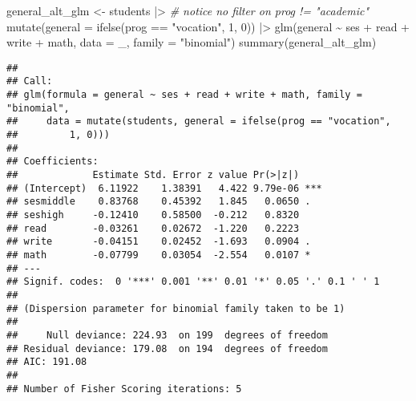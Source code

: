 \documentclass[
  oneside]{book}
\newenvironment{Shaded}{\begin{snugshade}}{\end{snugshade}}
\newcommand{\AttributeTok}[1]{\textcolor[rgb]{0.77,0.63,0.00}{#1}}
\newcommand{\CommentTok}[1]{\textcolor[rgb]{0.56,0.35,0.01}{\textit{#1}}}
\newcommand{\DecValTok}[1]{\textcolor[rgb]{0.00,0.00,0.81}{#1}}
\newcommand{\FunctionTok}[1]{\textcolor[rgb]{0.00,0.00,0.00}{#1}}
\newcommand{\NormalTok}[1]{#1}
\newcommand{\OtherTok}[1]{\textcolor[rgb]{0.56,0.35,0.01}{#1}}
\newcommand{\SpecialCharTok}[1]{\textcolor[rgb]{0.00,0.00,0.00}{#1}}
\newcommand{\StringTok}[1]{\textcolor[rgb]{0.31,0.60,0.02}{#1}}
\begin{document}
\begin{Shaded}
\begin{Highlighting}[]
\NormalTok{general\_alt\_glm }\OtherTok{\textless{}{-}}\NormalTok{ students }\SpecialCharTok{|\textgreater{}} \CommentTok{\# notice no filter on prog != "academic"}
  \FunctionTok{mutate}\NormalTok{(}\AttributeTok{general =} \FunctionTok{ifelse}\NormalTok{(prog }\SpecialCharTok{==} \StringTok{"vocation"}\NormalTok{, }\DecValTok{1}\NormalTok{, }\DecValTok{0}\NormalTok{)) }\SpecialCharTok{|\textgreater{}}
  \FunctionTok{glm}\NormalTok{(general }\SpecialCharTok{\textasciitilde{}}\NormalTok{ ses }\SpecialCharTok{+}\NormalTok{ read }\SpecialCharTok{+}\NormalTok{ write }\SpecialCharTok{+}\NormalTok{ math,}
    \AttributeTok{data =}\NormalTok{ \_, }\AttributeTok{family =} \StringTok{"binomial"}\NormalTok{)}
\FunctionTok{summary}\NormalTok{(general\_alt\_glm)}
\end{Highlighting}
\end{Shaded}

\begin{verbatim}
## 
## Call:
## glm(formula = general ~ ses + read + write + math, family = "binomial", 
##     data = mutate(students, general = ifelse(prog == "vocation", 
##         1, 0)))
## 
## Coefficients:
##             Estimate Std. Error z value Pr(>|z|)    
## (Intercept)  6.11922    1.38391   4.422 9.79e-06 ***
## sesmiddle    0.83768    0.45392   1.845   0.0650 .  
## seshigh     -0.12410    0.58500  -0.212   0.8320    
## read        -0.03261    0.02672  -1.220   0.2223    
## write       -0.04151    0.02452  -1.693   0.0904 .  
## math        -0.07799    0.03054  -2.554   0.0107 *  
## ---
## Signif. codes:  0 '***' 0.001 '**' 0.01 '*' 0.05 '.' 0.1 ' ' 1
## 
## (Dispersion parameter for binomial family taken to be 1)
## 
##     Null deviance: 224.93  on 199  degrees of freedom
## Residual deviance: 179.08  on 194  degrees of freedom
## AIC: 191.08
## 
## Number of Fisher Scoring iterations: 5
\end{verbatim}

\begin{Shaded}
\end{Shaded}
\end{document}

